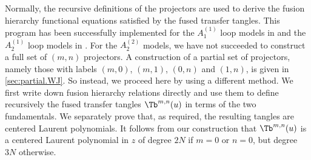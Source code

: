 \documentclass[11pt]{article}
\numberwithin{equation}{section}
\theoremstyle{plain}
\numberwithin{equation}{section}
\begin{document}
Normally, the recursive definitions of the projectors are used to derive the fusion hierarchy functional equations satisfied by the fused transfer tangles. This program has been successfully implemented for the $A_1^{(1)}$ loop models in \cite{MDPR2014} and the $A_2^{(1)}$ loop models in \cite{MDPR2018}. 
For the $A_2^{(2)}$ models, we have not succeeded to construct a full set of $(m,n)$ projectors. A construction of a partial set of projectors, namely those with labels $(m,0)$, $(m,1)$, $(0,n)$ and $(1,n)$, is given in \cref{sec:partial.WJ}. So instead, we proceed here by using a different method. 
We first write down fusion hierarchy relations directly and use them to define recursively the fused transfer tangles $\Tb^{m,n}(u)$ in terms of the two fundamentals. We separately prove that, as required, the resulting tangles are centered Laurent polynomials. It follows from our construction that $\Tb^{m,n}(u)$ is a centered Laurent polynomial in $z$ of degree $2N$ if $m = 0$ or $n=0$, but degree $3N$ otherwise.
\end{document}
